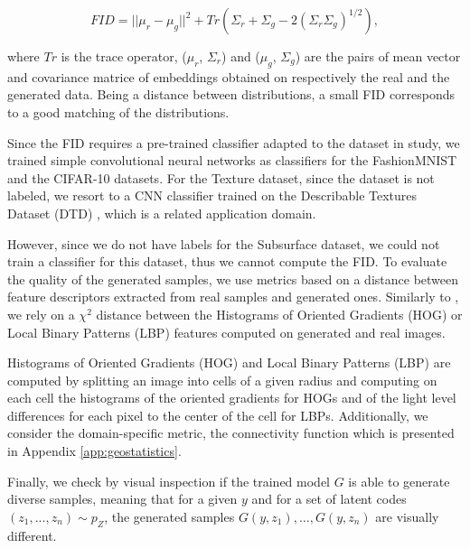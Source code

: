 \begin{equation}
FID = ||\mu_r - \mu_g||^2+Tr(\Sigma_r+\Sigma_g - 2(\Sigma_r\Sigma_g)^{1/2}),
\label{eq:fid}
\end{equation}

\noindent where $Tr$ is the trace operator, ($\mu_r$, $\Sigma_r$) and ($\mu_g$, $\Sigma_g$) are the pairs of mean vector and covariance matrice of embeddings obtained on respectively the real and the generated data. Being a distance between distributions,  a small FID corresponds to a good matching of the distributions.

Since the FID requires a pre-trained classifier adapted to the dataset in study, we trained simple convolutional neural networks as classifiers for the FashionMNIST and the CIFAR-10 datasets. For the Texture dataset, since the dataset is not labeled, we resort to a CNN classifier trained on the Describable Textures Dataset (DTD) \cite{cimpoi14describing}, which is a related application domain.

However, since we do not have labels for the Subsurface dataset, we could not train a classifier for this dataset, thus we cannot compute the FID. To evaluate the quality of the generated samples, we use metrics based on a distance between feature descriptors extracted from real samples and generated ones. Similarly to \cite{ruffino2018dilated}, we rely on a $\chi^2$ distance between the Histograms of Oriented Gradients (HOG) or Local Binary Patterns (LBP) features computed on generated and real images. 

Histograms of Oriented Gradients (HOG) \cite{Dalal} and Local Binary Patterns (LBP) \cite{Pietikainen2011} are computed by splitting an image into cells of a given radius and computing on each cell the histograms of the oriented gradients for HOGs and of the light level differences for each pixel to the center of the cell for LBPs.  Additionally, we consider the domain-specific metric, the connectivity function \cite{lemmens2017} which is presented in Appendix \ref{app:geostatistics}.

Finally, we check by visual inspection if the trained model $G$ is able to generate diverse samples, meaning that for a given $y$ and for a set of latent codes $(z_1, ..., z_n) \sim p_Z$, the generated samples $G(y,z_1), \ldots, G(y, z_n)$ are visually different. 




